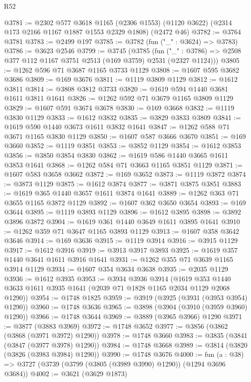 \begin{lexlean}{R52}
\begin{coremodule}
@3781 := @2302
    @577
    @3618
    @1165
    (@2306 @1553)
    (@1120 @3622)
    (@2314 @173 @2166 @1167 @1887 @1553 @2329 @1808)
    (@2472 @46)
@3782 := @3764 @3781
@3783 := @2499 @197
@3785 := @3782 (fun ("_" : @3624) => @3783)
@3786 := @3623 @2546
@3799 := @3745
    (@3785
      (fun ("_" : @3786) => @2508 @377 @112 @1167 @3751 @2513 (@169 @3759) @2531 (@2327 @1124)))
@3805 := @1262 @596 @71 @3687 @1165 @3733 @1129
@3808 := @1607 @595 @3682 @3686
@3809 := @169 @3676
@3811 := @1119 @3809 @1129
@3812 := @1612 @3811
@3814 := @3808 @3812 @3733
@3820 := @1619 @594 @1440 @3681 @1611 @3811 @1641
@3826 := @1262 @592 @71 @3679 @1165 @3809 @1129
@3829 := @1607 @591 @3674 @3678
@3830 := @169 @3668
@3832 := @1119 @3830 @1129
@3833 := @1612 @3832
@3835 := @3829 @3833 @3809
@3841 := @1619 @590 @1440 @3673 @1611 @3832 @1641
@3847 := @1262 @588 @71 @3671 @1165 @3830 @1129
@3850 := @1607 @587 @3666 @3670
@3851 := @169 @3660
@3852 := @1119 @3851
@3853 := @3852 @1129
@3854 := @1612 @3853
@3856 := @3850 @3854 @3830
@3862 := @1619 @586 @1440 @3665 @1611 @3853 @1641
@3868 := @1262 @584 @71 @3663 @1165 @3851 @1129
@3871 := @1607 @583 @3658 @3662
@3872 := @169 @3652
@3873 := @1119 @3872
@3874 := @3873 @1129
@3875 := @1612 @3874
@3877 := @3871 @3875 @3851
@3883 := @1619 @365 @1440 @3657 @1611 @3874 @1641
@3889 := @1262 @363 @71 @3655 @1165 @3872 @1129
@3892 := @1607 @362 @3650 @3654
@3893 := @169 @3644
@3895 := @1119 @3893 @1129
@3896 := @1612 @3895
@3898 := @3892 @3896 @3872
@3904 := @1619 @361 @1440 @3649 @1611 @3895 @1641
@3910 := @1262 @359 @71 @3647 @1165 @3893 @1129
@3913 := @1607 @358 @3642 @3646
@3914 := @169 @3636
@3915 := @1119 @3914
@3916 := @3915 @1129
@3917 := @1612 @3916
@3919 := @3913 @3917 @3893
@3925 := @1619 @357 @1440 @3641 @1611 @3916 @1641
@3931 := @1262 @355 @71 @3639 @1165 @3914 @1129
@3934 := @1607 @354 @3634 @3638
@3935 := @2035 @1129
@3936 := @1612 @3935
@3953 := @3934
    @3936
    @3914
    (@1619 @353 @1440 @3633 @1611 @3935 @1641 (@2039 @71 @1828 @1165 @2034 @1129 @2068 @1290))
@3954 := @1748 @1825
@3959 := @3919 (@3925 (@3931 (@3953 @3954) @1290))
@3960 := @1748 @3636
@3965 := @3898 (@3904 (@3910 (@3959 @3960) @1290))
@3966 := @1748 @3644
@3969 := @3889 (@3965 @3966) @1290
@3971 := @3877 (@3883 @3969)
@3972 := @1748 @3652
@3977 := @3856 (@3862 (@3868 (@3971 @3972) @1290))
@3978 := @1748 @3660
@3983 := @3835 (@3841 (@3847 (@3977 @3978) @1290))
@3984 := @1748 @3668
@3989 := @3814 (@3820 (@3826 (@3983 @3984) @1290))
@3990 := @1748 @3676
@4000 := fun (a : @38) => @3727 (@3739 (@3799 (@3805 (@3989 @3990) @1290)) (@1294 @3696 @3684))
@4002 := @3621 (@3629 @1873)

\end{coremodule}
\end{lexlean}
